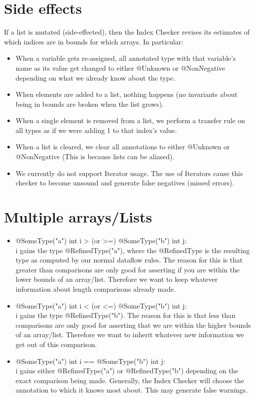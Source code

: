 \section{Side effects\label{index-side-effects}}

If a list is mutated (side-effected), then the Index Checker revises its
estimates of which indices are in bounds for which arrays. In particular:
\begin{itemize}
\item When a variable gets re-assigned, all annotated type with that variable's name as its value
get changed to either @Unknown or @NonNegative depending on what we already know about the type.
\item When elements are added to a list, nothing happens (no invariants about being in bounds are
broken when the list grows).
\item When a single element is removed from a list, we perform a transfer rule on all types as if
we were adding 1 to that index's value.
\item When a list is cleared, we clear all annotations to either @Unknown or @NonNegative (This is
because lists can be aliased).
\item We currently do not support Iterator usage. The use of Iterators cause this checker to become
unsound and generate false negatives (missed errors).
\end{itemize}

\section{Multiple arrays/Lists\label{index-multiples}}
\begin{itemize}
\item @SomeType("a") int i > (or >=) @SomeType("b") int j:\\
i gains the type @RefinedType("a"), where the @RefinedType is the resulting type as computed by our
normal dataflow rules. The reason for this is that greater than comparisons are only good for
asserting if you are within the lower bounds of an array/list. Therefore we want to keep whatever
information about length comparisons already made.
\item @SomeType("a") int i < (or <=) @SomeType("b") int j:\\
i gains the type @RefinedType("b"). The
reason for this is that less than comparisons are only good for asserting that we are within the
higher bounds of an array/list. Therefore we want to inherit whatever new information we get out of
this comparison.
\item @SomeType("a") int i == @SomeType("b") int j:\\
i gains either @RefinedType("a") or @RefinedType("b") depending on the exact comparison being made.
Generally, the Index Checker will choose the annotation to which it knows most about. This may generate
false warnings.
\end{itemize}
